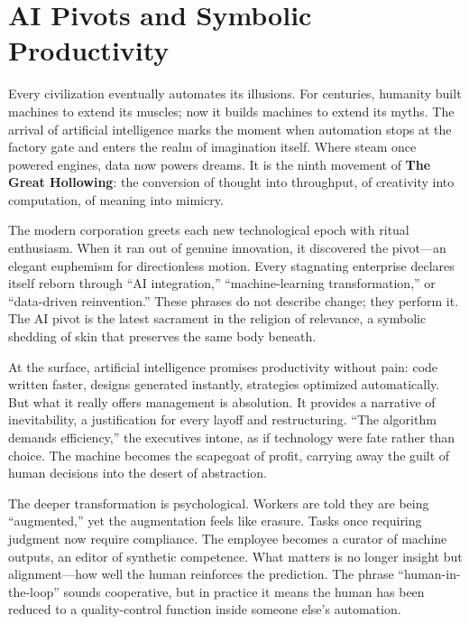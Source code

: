 \documentclass[11pt,twoside]{book}
\begin{document}
%
\chapter{AI Pivots and Symbolic Productivity}
\label{ch:09}

Every civilization eventually automates its illusions.  
For centuries, humanity built machines to extend its muscles; now it builds machines to extend its myths.  The arrival of artificial intelligence marks the moment when automation stops at the factory gate and enters the realm of imagination itself.  Where steam once powered engines, data now powers dreams.  It is the ninth movement of \textbf{The Great Hollowing}: the conversion of thought into throughput, of creativity into computation, of meaning into mimicry.

The modern corporation greets each new technological epoch with ritual enthusiasm.  When it ran out of genuine innovation, it discovered the pivot—an elegant euphemism for directionless motion.  Every stagnating enterprise declares itself reborn through “AI integration,” “machine-learning transformation,” or “data-driven reinvention.”  These phrases do not describe change; they perform it.  The AI pivot is the latest sacrament in the religion of relevance, a symbolic shedding of skin that preserves the same body beneath.

At the surface, artificial intelligence promises productivity without pain: code written faster, designs generated instantly, strategies optimized automatically.  But what it really offers management is absolution.  It provides a narrative of inevitability, a justification for every layoff and restructuring.  “The algorithm demands efficiency,” the executives intone, as if technology were fate rather than choice.  The machine becomes the scapegoat of profit, carrying away the guilt of human decisions into the desert of abstraction.

The deeper transformation is psychological.  Workers are told they are being “augmented,” yet the augmentation feels like erasure.  Tasks once requiring judgment now require compliance.  The employee becomes a curator of machine outputs, an editor of synthetic competence.  What matters is no longer insight but alignment—how well the human reinforces the prediction.  The phrase “human-in-the-loop” sounds cooperative, but in practice it means the human has been reduced to a quality-control function inside someone else’s automation.
\end{document}
